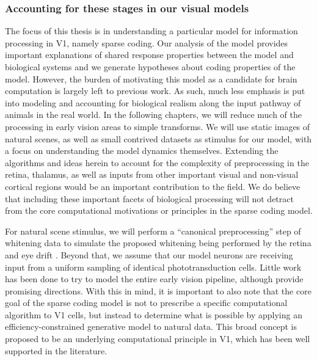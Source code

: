 \subsubsection{Accounting for these stages in our visual models}
The focus of this thesis is in understanding a particular model for information processing in V1, namely sparse coding. Our analysis of the model provides important explanations of shared response properties between the model and biological systems and we generate hypotheses about coding properties of the model. However, the burden of motivating this model as a candidate for brain computation is largely left to previous work. As such, much less emphasis is put into modeling and accounting for biological realism along the input pathway of animals in the real world. In the following chapters, we will reduce much of the processing in early vision areas to simple transforms. We will use static images of natural scenes, as well as small contrived datasets as stimulus for our model, with a focus on understanding the model dynamics themselves. Extending the algorithms and ideas herein to account for the complexity of preprocessing in the retina, thalamus, as well as inputs from other important visual and non-visual cortical regions would be an important contribution to the field. We do believe that including these important facets of biological processing will not detract from the core computational motivations or principles in the sparse coding model.

For natural scene stimulus, we will perform a ``canonical preprocessing'' step of whitening data to simulate the proposed whitening being performed by the retina and eye drift \parencite{atick1992what, rucci2015unsteady}. Beyond that, we assume that our model neurons are receiving input from a uniform sampling of identical phototransduction cells. Little work has been done to try to model the entire early vision pipeline, although \parencite{shan2013efficient, doi2007theory, lindsey2019unified} provide promising directions. With this in mind, it is important to also note that the core goal of the sparse coding model is not to prescribe a specific computational algorithm to V1 cells, but instead to determine what is possible by applying an efficiency-constrained generative model to natural data. This broad concept is proposed to be an underlying computational principle in V1, which has been well supported in the literature.

